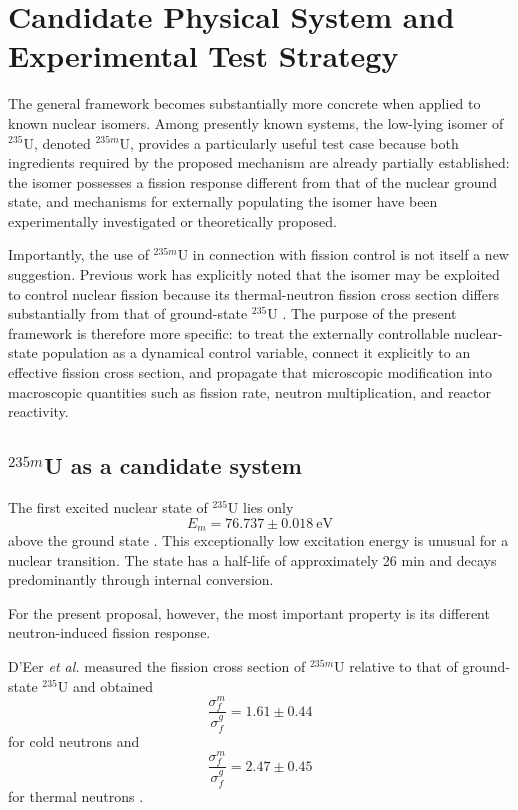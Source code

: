 \section{Candidate Physical System and Experimental Test Strategy}
\label{sec:candidate_system}

The general framework becomes substantially more concrete when applied to known nuclear isomers. Among presently known systems, the low-lying isomer of $^{235}$U, denoted $^{235m}$U, provides a particularly useful test case because both ingredients required by the proposed mechanism are already partially established: the isomer possesses a fission response different from that of the nuclear ground state, and mechanisms for externally populating the isomer have been experimentally investigated or theoretically proposed.

Importantly, the use of $^{235m}$U in connection with fission control is not itself a new suggestion. Previous work has explicitly noted that the isomer may be exploited to control nuclear fission because its thermal-neutron fission cross section differs substantially from that of ground-state $^{235}$U \cite{DEer1988,LiuWang2022}. The purpose of the present framework is therefore more specific: to treat the externally controllable nuclear-state population as a dynamical control variable, connect it explicitly to an effective fission cross section, and propagate that microscopic modification into macroscopic quantities such as fission rate, neutron multiplication, and reactor reactivity.

\subsection{\texorpdfstring{$^{235m}$U}{235mU} as a candidate system}

The first excited nuclear state of $^{235}$U lies only
\begin{equation}
E_m
=
76.737\pm0.018\ \mathrm{eV}
\end{equation}
above the ground state \cite{Ponce2018}. This exceptionally low excitation energy is unusual for a nuclear transition. The state has a half-life of approximately 26 min and decays predominantly through internal conversion.

For the present proposal, however, the most important property is its different neutron-induced fission response.

D'Eer \textit{et al.} measured the fission cross section of $^{235m}$U relative to that of ground-state $^{235}$U and obtained
\begin{equation}
\frac{\sigma_f^m}{\sigma_f^g}
=
1.61\pm0.44
\end{equation}
for cold neutrons and
\begin{equation}
\frac{\sigma_f^m}{\sigma_f^g}
=
2.47\pm0.45
\end{equation}
for thermal neutrons \cite{DEer1988}.

